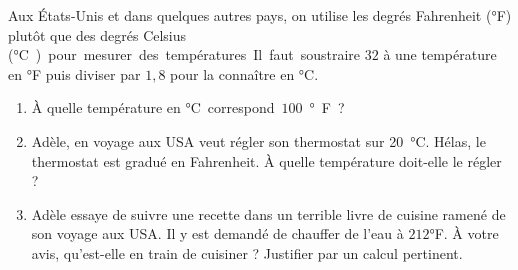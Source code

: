 

\begin{exercice}\label{exo2smath-0174}

Aux États-Unis et dans quelques autres pays, on utilise les degrés Fahrenheit (°F) plutôt que des degrés Celsius (\si\degreeCelsius) pour mesurer des températures. Il faut soustraire $32$ à une température en °F puis diviser par $1,8$ pour la connaître en °C.  

\begin{enumerate}
    \item
        À quelle température en \si\degreeCelsius correspond \( 100 \) °F ?
    \item
        Adèle, en voyage aux USA veut régler son thermostat sur \SI{20}{\degreeCelsius}. Hélas, le thermostat est gradué en Fahrenheit. À quelle température doit-elle le régler ?
    \item
        Adèle essaye de suivre une recette dans un terrible livre de cuisine ramené de son voyage aux USA. Il y est demandé de chauffer de l'eau à \( 212\)°F. À votre avis, qu'est-elle en train de cuisiner ? Justifier par un calcul pertinent.
\end{enumerate}


\end{exercice}
